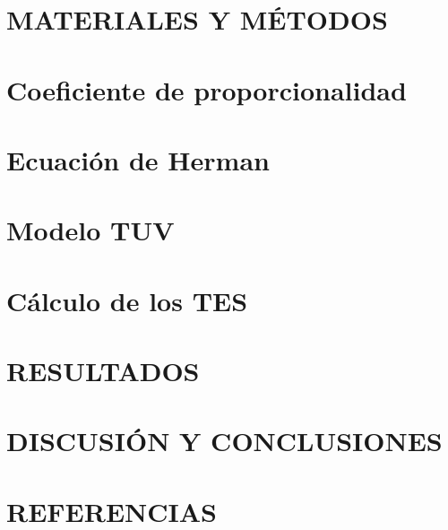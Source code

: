 \documentclass[10pt,twocolumn]{article}
\begin{document}
\section{MATERIALES Y MÉTODOS}

\section{Coeficiente de proporcionalidad}

\section{Ecuación de Herman}

\section{Modelo TUV}

\section{Cálculo de los TES}

\section{RESULTADOS}

\section{DISCUSIÓN Y CONCLUSIONES}

\section{REFERENCIAS}
\renewcommand{\refname}{}

\end{document}
